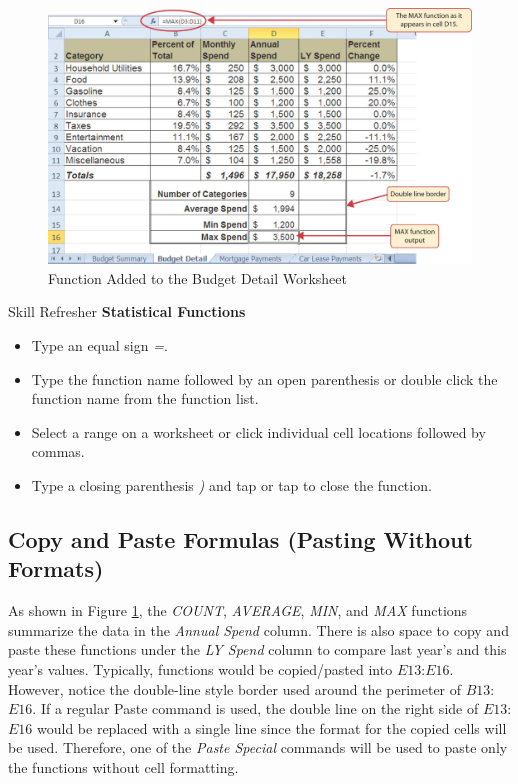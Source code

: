 \begin{figure}[H]
	\centering
	\includegraphics[width=\maxwidth{.95\linewidth}]{gfx/ch02_fig25}
	\caption{ Function Added to the Budget Detail Worksheet}
	\label{02:fig25}
\end{figure}

\begin{center}
	\begin{sklbox}{Skill Refresher}
		\textbf{Statistical Functions}
		\\
		\begin{itemize}
			\setlength{\itemsep}{0pt}
			\setlength{\parskip}{0pt}
			\setlength{\parsep}{0pt}

			\item Type an equal sign \textit{=}.
			\item Type the function name followed by an open parenthesis \fmtTyping{(} or double click the function name from the function list.
			\item Select a range on a worksheet or click individual cell locations followed by commas.
			\item Type a closing parenthesis \textit{)} and tap  or tap  to close the function.
			
		\end{itemize}
	\end{sklbox}
\end{center}

\subsection{Copy and Paste Formulas (Pasting Without Formats)}

As shown in Figure \ref{02:fig25}, the \textit{COUNT}, \textit{AVERAGE}, \textit{MIN}, and \textit{MAX} functions summarize the data in the \textit{Annual Spend} column. There is also space to copy and paste these functions under the \textit{LY Spend} column to compare last year's and this year’s values. Typically, functions would be copied/pasted into $ E13 $:$ E16 $. However, notice the double-line style border used around the perimeter of $ B13 $:$ E16 $. If a regular Paste command is used, the double line on the right side of $ E13 $:$ E16 $ would be replaced with a single line since the format for the copied cells will be used. Therefore, one of the \textit{Paste Special} commands will be used to paste only the functions without cell formatting. 


